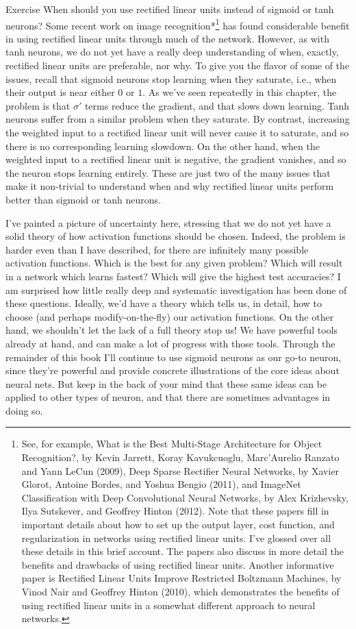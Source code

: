 \begin{exerciseBox}{Exercise}
When should you use rectified linear units instead of sigmoid or tanh neurons? Some recent work on image recognition*\footnote{See, for example, What is the Best Multi-Stage Architecture for Object Recognition?, by Kevin Jarrett, Koray Kavukcuoglu, Marc'Aurelio Ranzato and Yann LeCun (2009), Deep Sparse Rectiﬁer Neural Networks, by Xavier Glorot, Antoine Bordes, and Yoshua Bengio (2011), and ImageNet Classification with Deep Convolutional Neural Networks, by Alex Krizhevsky, Ilya Sutskever, and Geoffrey Hinton (2012). Note that these papers fill in important details about how to set up the output layer, cost function, and regularization in networks using rectified linear units. I've glossed over all these details in this brief account. The papers also discuss in more detail the benefits and drawbacks of using rectified linear units. Another informative paper is Rectified Linear Units Improve Restricted Boltzmann Machines, by Vinod Nair and Geoffrey Hinton (2010), which demonstrates the benefits of using rectified linear units in a somewhat different approach to neural networks.} has found considerable benefit in using rectified linear units through much of the network. However, as with tanh neurons, we do not yet have a really deep understanding of when, exactly, rectified linear units are preferable, nor why. To give you the flavor of some of the issues, recall that sigmoid neurons stop learning when they saturate, i.e., when their output is near either $0$ or $1$. As we've seen repeatedly in this chapter, the problem is that $\sigma'$ terms reduce the gradient, and that slows down learning. Tanh neurons suffer from a similar problem when they saturate. By contrast, increasing the weighted input to a rectified linear unit will never cause it to saturate, and so there is no corresponding learning slowdown. On the other hand, when the weighted input to a rectified linear unit is negative, the gradient vanishes, and so the neuron stops learning entirely. These are just two of the many issues that make it non-trivial to understand when and why rectified linear units perform better than sigmoid or tanh neurons.


I've painted a picture of uncertainty here, stressing that we do not yet have a solid theory of how activation functions should be chosen. Indeed, the problem is harder even than I have described, for there are infinitely many possible activation functions. Which is the best for any given problem? Which will result in a network which learns fastest? Which will give the highest test accuracies? I am surprised how little really deep and systematic investigation has been done of these questions. Ideally, we'd have a theory which tells us, in detail, how to choose (and perhaps modify-on-the-fly) our activation functions. On the other hand, we shouldn't let the lack of a full theory stop us! We have powerful tools already at hand, and can make a lot of progress with those tools. Through the remainder of this book I'll continue to use sigmoid neurons as our go-to neuron, since they're powerful and provide concrete illustrations of the core ideas about neural nets. But keep in the back of your mind that these same ideas can be applied to other types of neuron, and that there are sometimes advantages in doing so.


\end{exerciseBox}
